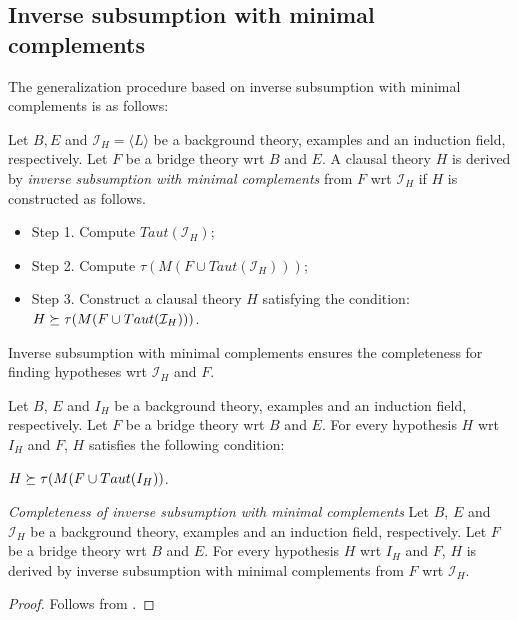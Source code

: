 \subsection{Inverse subsumption with minimal complements}
The generalization procedure based on inverse subsumption with minimal complements is as follows:

\begin{defn}\label{inverse_subsumption_with_minimal_complements_algorithm}
Let $B, E$ and $\mathcal{I}_H = \langle L \rangle$ be a background theory, examples and an induction
field, respectively. Let $F$ be a bridge theory wrt $B$ and $E$. A clausal theory $H$ is derived
by \emph{inverse subsumption with minimal complements} from $F$ wrt $\mathcal{I}_H$ if $H$ is constructed as follows.
\begin{itemize}
\item Step 1. Compute $Taut(\mathcal{I}_H)$;
\item Step 2. Compute $\tau(M(F \cup Taut(\mathcal{I}_H)))$;
\item Step 3. Construct a clausal theory $H$ satisfying the condition:
$H \succeq \tau(M(F \cup Taut(\mathcal{I}_H)))$.
\end{itemize}
\end{defn}

Inverse subsumption with minimal complements ensures the completeness for finding
hypotheses wrt $\mathcal{I}_H$ and $F$.

\begin{lemma}\label{yamamoto2012inverseLemma2}\cite{yamamoto2012inverse}
Let $B$, $E$ and $I_H$ be a background theory, examples and an induction field,
respectively. Let $F$ be a bridge theory wrt $B$ and $E$. For every hypothesis $H$ wrt $I_H$ and $F$, $H$ satisfies the following condition:

$H \succeq \tau(M(F \cup Taut(I_H))$.
\end{lemma}

\begin{thm}\emph{Completeness of inverse subsumption with minimal complements} Let $B$, $E$ and $\mathcal{I}_H$ be a background theory, examples and an induction field,
respectively. Let $F$ be a bridge theory wrt $B$ and $E$. For every hypothesis $H$ wrt $I_H$ and $F$,
$H$ is derived by inverse subsumption with minimal complements from $F$ wrt $\mathcal{I}_H$.
\end{thm}
\begin{proof}
Follows from .
\end{proof}